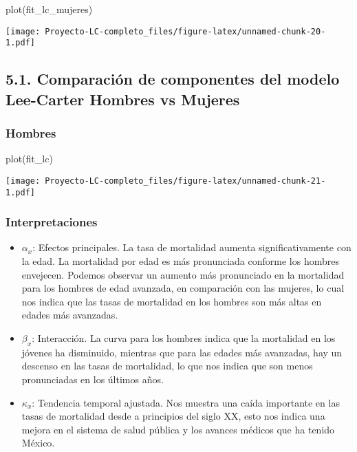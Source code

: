 \documentclass[
]{article}
\newenvironment{Shaded}{\begin{snugshade}}{\end{snugshade}}
\newcommand{\FunctionTok}[1]{\textcolor[rgb]{0.00,0.00,0.00}{#1}}
\newcommand{\NormalTok}[1]{#1}
\begin{document}
\begin{Shaded}
\begin{Highlighting}[]
\FunctionTok{plot}\NormalTok{(fit\_lc\_mujeres)}
\end{Highlighting}
\end{Shaded}

\texttt{[image: Proyecto-LC-completo\_files/figure-latex/unnamed-chunk-20-1.pdf]}

\clearpage

\hypertarget{comparaciuxf3n-de-componentes-del-modelo-lee-carter-hombres-vs-mujeres}{%
\subsection{5.1. Comparación de componentes del modelo Lee-Carter
Hombres vs
Mujeres}\label{comparaciuxf3n-de-componentes-del-modelo-lee-carter-hombres-vs-mujeres}}

\hypertarget{hombres}{%
\subsubsection{Hombres}\label{hombres}}

\begin{Shaded}
\begin{Highlighting}[]
\FunctionTok{plot}\NormalTok{(fit\_lc)}
\end{Highlighting}
\end{Shaded}

\texttt{[image: Proyecto-LC-completo\_files/figure-latex/unnamed-chunk-21-1.pdf]}

\hypertarget{interpretaciones}{%
\subsubsection{Interpretaciones}\label{interpretaciones}}

\begin{itemize}
\item
  \(\alpha_x\): Efectos principales. La tasa de mortalidad aumenta
  significativamente con la edad. La mortalidad por edad es más
  pronunciada conforme los hombres envejecen. Podemos observar un
  aumento más pronunciado en la mortalidad para los hombres de edad
  avanzada, en comparación con las mujeres, lo cual nos indica que las
  tasas de mortalidad en los hombres son más altas en edades más
  avanzadas.
\item
  \(\beta_x\): Interacción. La curva para los hombres indica que la
  mortalidad en los jóvenes ha disminuido, mientras que para las edades
  más avanzadas, hay un descenso en las tasas de mortalidad, lo que nos
  indica que son menos pronunciadas en los últimos años.
\item
  \(\kappa_x\): Tendencia temporal ajustada. Nos muestra una caída
  importante en las tasas de mortalidad desde a principios del siglo XX,
  esto nos indica una mejora en el sistema de salud pública y los
  avances médicos que ha tenido México.
\end{itemize}
\end{document}

